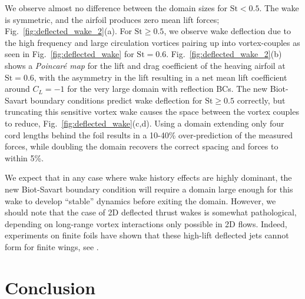 \documentclass[final,1p,times]{elsarticle}
\begin{document}
We observe almost no difference between the domain sizes for $\text{St}<0.5$. The wake is symmetric, and the airfoil produces zero mean lift forces; Fig.~\ref{fig:deflected_wake_2}(a). For $\text{St}\ge 0.5$, we observe wake deflection due to the high frequency and large circulation vortices pairing up into vortex-couples as seen in Fig.~\ref{fig:deflected_wake} for $\text{St}=0.6$. Fig.~\ref{fig:deflected_wake_2}(b) shows a \emph{Poincar\'e map} for the lift and drag coefficient of the heaving airfoil at $\text{St}=0.6$, with the asymmetry in the lift resulting in a net mean lift coefficient around $C_L=-1$ for the very large domain with reflection BCs. The new Biot-Savart boundary conditions predict wake deflection for $\text{St}\ge 0.5$ correctly, but truncating this sensitive vortex wake causes the space between the vortex couples to reduce, Fig.~\ref{fig:deflected_wake}(c,d). Using a domain extending only four cord lengths behind the foil results in a 10-40\% over-prediction of the measured forces, while doubling the domain recovers the correct spacing and forces to within 5\%.

We expect that in any case where wake history effects are highly dominant, the new Biot-Savart boundary condition will require a domain large enough for this wake to develop ``stable'' dynamics before exiting the domain. However, we should note that the case of 2D deflected thrust wakes is somewhat pathological, depending on long-range vortex interactions only possible in 2D flows. Indeed, experiments on finite foils have shown that these high-lift deflected jets cannot form for finite wings, see \cite{Calderon2014OnWings, Godoy-Diana2008TransitionFoil}.
 
\section{Conclusion}
\end{document}
